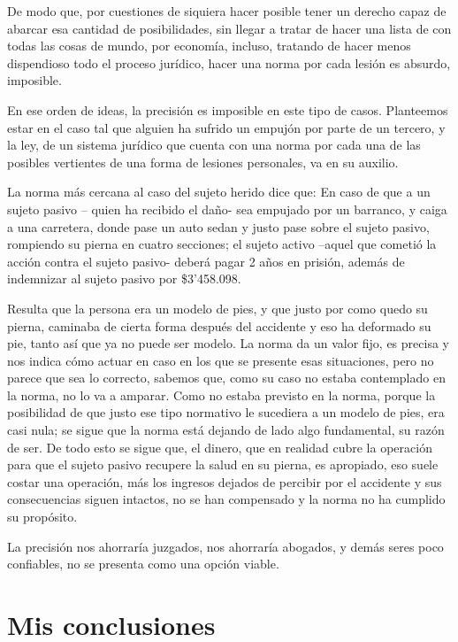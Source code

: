 \documentclass[]{book}
\begin{document}
De modo que, por cuestiones de siquiera hacer posible tener un derecho
capaz de abarcar esa cantidad de posibilidades, sin llegar a tratar de
hacer una lista de con todas las cosas de mundo, por economía, incluso,
tratando de hacer menos dispendioso todo el proceso jurídico, hacer una
norma por cada lesión es absurdo, imposible.

En ese orden de ideas, la precisión es imposible en este tipo de casos.
Planteemos estar en el caso tal que alguien ha sufrido un empujón por
parte de un tercero, y la ley, de un sistema jurídico que cuenta con una
norma por cada una de las posibles vertientes de una forma de lesiones
personales, va en su auxilio.

La norma más cercana al caso del sujeto herido dice que: En caso de que
a un sujeto pasivo -- quien ha recibido el daño- sea empujado por un
barranco, y caiga a una carretera, donde pase un auto sedan y justo pase
sobre el sujeto pasivo, rompiendo su pierna en cuatro secciones; el
sujeto activo --aquel que cometió la acción contra el sujeto pasivo-
deberá pagar 2 años en prisión, además de indemnizar al sujeto pasivo
por \$3'458.098.

Resulta que la persona era un modelo de pies, y que justo por como quedo
su pierna, caminaba de cierta forma después del accidente y eso ha
deformado su pie, tanto así que ya no puede ser modelo. La norma da un
valor fijo, es precisa y nos indica cómo actuar en caso en los que se
presente esas situaciones, pero no parece que sea lo correcto, sabemos
que, como su caso no estaba contemplado en la norma, no lo va a amparar.
Como no estaba previsto en la norma, porque la posibilidad de que justo
ese tipo normativo le sucediera a un modelo de pies, era casi nula; se
sigue que la norma está dejando de lado algo fundamental, su razón de
ser. De todo esto se sigue que, el dinero, que en realidad cubre la
operación para que el sujeto pasivo recupere la salud en su pierna, es
apropiado, eso suele costar una operación, más los ingresos dejados de
percibir por el accidente y sus consecuencias siguen intactos, no se han
compensado y la norma no ha cumplido su propósito.

La precisión nos ahorraría juzgados, nos ahorraría abogados, y demás
seres poco confiables, no se presenta como una opción viable.

\section*{Mis conclusiones}
\end{document}
